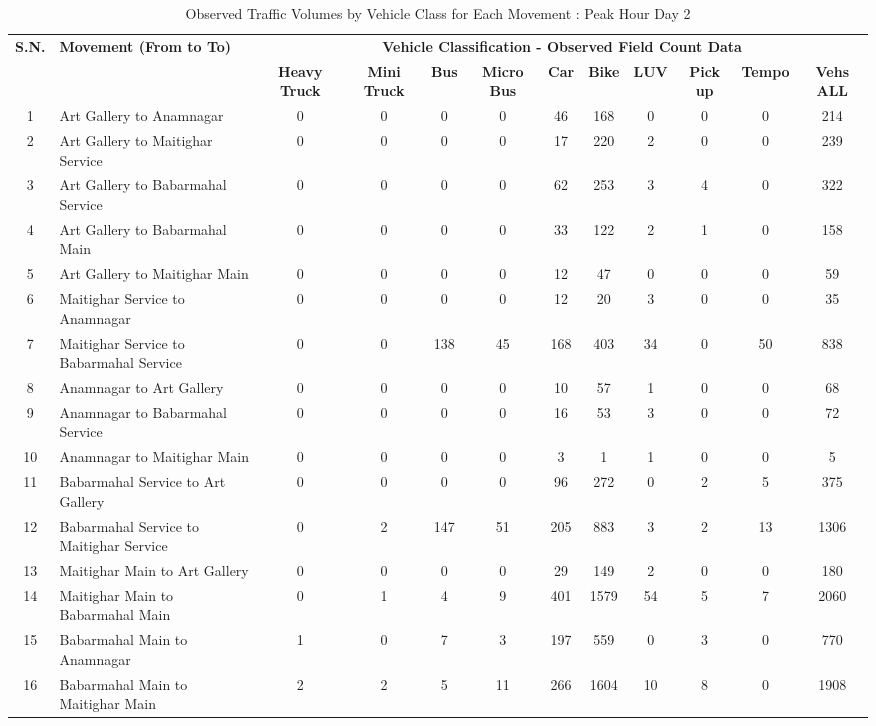 \begin{landscape}
\begin{table}[h!]
\centering
\small
\setlength{\tabcolsep}{5pt}
\caption{Observed Traffic Volumes by Vehicle Class for Each Movement : Peak Hour Day 2}
\begin{tabular}{|c|p{6cm}|c|c|c|c|c|c|c|c|c|c|}
\hline
\textbf{S.N.} & \textbf{Movement (From to To)} & \multicolumn{10}{c|}{\textbf{Vehicle Classification - Observed Field Count Data}} \\
\cline{3-12}
& & \textbf{Heavy Truck} & \textbf{Mini Truck} & \textbf{Bus} & \textbf{Micro Bus} & \textbf{Car} & \textbf{Bike} & \textbf{LUV} & \textbf{Pick up} & \textbf{Tempo} & \textbf{Vehs ALL} \\
\hline
1 & Art Gallery to Anamnagar & 0 & 0 & 0 & 0 & 46 & 168 & 0 & 0 & 0 & 214 \\ \hline
2 & Art Gallery to Maitighar Service & 0 & 0 & 0 & 0 & 17 & 220 & 2 & 0 & 0 & 239 \\ \hline
3 & Art Gallery to Babarmahal Service & 0 & 0 & 0 & 0 & 62 & 253 & 3 & 4 & 0 & 322 \\ \hline
4 & Art Gallery to Babarmahal Main & 0 & 0 & 0 & 0 & 33 & 122 & 2 & 1 & 0 & 158 \\ \hline
5 & Art Gallery to Maitighar Main & 0 & 0 & 0 & 0 & 12 & 47 & 0 & 0 & 0 & 59 \\ \hline
6 & Maitighar Service to Anamnagar & 0 & 0 & 0 & 0 & 12 & 20 & 3 & 0 & 0 & 35 \\ \hline
7 & Maitighar Service to Babarmahal Service & 0 & 0 & 138 & 45 & 168 & 403 & 34 & 0 & 50 & 838 \\ \hline
8 & Anamnagar to Art Gallery & 0 & 0 & 0 & 0 & 10 & 57 & 1 & 0 & 0 & 68 \\ \hline
9 & Anamnagar to Babarmahal Service & 0 & 0 & 0 & 0 & 16 & 53 & 3 & 0 & 0 & 72 \\ \hline
10 & Anamnagar to Maitighar Main & 0 & 0 & 0 & 0 & 3 & 1 & 1 & 0 & 0 & 5 \\ \hline
11 & Babarmahal Service to Art Gallery & 0 & 0 & 0 & 0 & 96 & 272 & 0 & 2 & 5 & 375 \\ \hline
12 & Babarmahal Service to Maitighar Service & 0 & 2 & 147 & 51 & 205 & 883 & 3 & 2 & 13 & 1306 \\ \hline
13 & Maitighar Main to Art Gallery & 0 & 0 & 0 & 0 & 29 & 149 & 2 & 0 & 0 & 180 \\ \hline
14 & Maitighar Main to Babarmahal Main & 0 & 1 & 4 & 9 & 401 & 1579 & 54 & 5 & 7 & 2060 \\ \hline
15 & Babarmahal Main to Anamnagar & 1 & 0 & 7 & 3 & 197 & 559 & 0 & 3 & 0 & 770 \\ \hline
16 & Babarmahal Main to Maitighar Main & 2 & 2 & 5 & 11 & 266 & 1604 & 10 & 8 & 0 & 1908 \\ \hline

\end{tabular}
\end{table}
\end{landscape}


